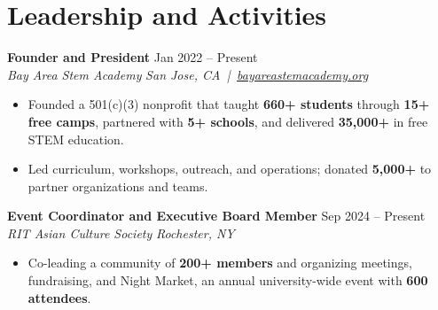 \documentclass[10pt,letterpaper]{article}
\newif\ifresumeFirstRole
\newcommand{\resumeRole}[4]{%
  \ifresumeFirstRole
    \global\resumeFirstRolefalse
  \else
    \vspace{0pt plus 1fill}%
  \fi
  \textbf{#1} \hfill #2\\
  \textit{#3} \hfill \textit{#4}
}
\begin{document}
\section*{Leadership and Activities}
\resumeRole{Founder and President}{Jan 2022 -- Present}{Bay Area Stem Academy}{San Jose, CA \,|\, \href{https://bayareastemacademy.org}{bayareastemacademy.org}}
\begin{itemize}
  \item Founded a 501(c)(3) nonprofit that taught \textbf{660+ students} through \textbf{15+ free camps}, partnered with \textbf{5+ schools}, and delivered \textbf{\textdollar{}35,000+} in free STEM education.
  \item Led curriculum, workshops, outreach, and operations; donated \textbf{\textdollar{}5,000+} to partner organizations and teams.
\end{itemize}

\resumeRole{Event Coordinator and Executive Board Member}{Sep 2024 -- Present}{RIT Asian Culture Society}{Rochester, NY}
\begin{itemize}
  \item Co-leading a community of \textbf{200+ members} and organizing meetings, fundraising, and Night Market, an annual university-wide event with \textbf{600 attendees}.
\end{itemize}
\end{document}
